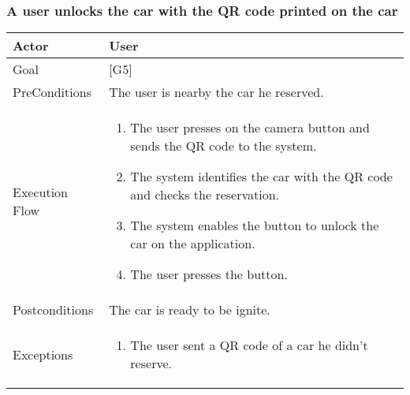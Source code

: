 \documentclass{article}
\begin{document}
	\subsubsection{A user unlocks the car with the QR code printed on the car}
	\begin{tabularx}{\textwidth}{  l  X  }
		\hline
		Actor & User\\
		\hline
		Goal & [G5]\\
		\hline
		PreConditions & The user is nearby the car he reserved.\\
		\hline
		Execution Flow & \begin{enumerate}
			\item{The user presses on the camera button and sends the QR code to the system.}
										 \item{The system identifies the car with the QR code and checks the reservation.}
										 \item{The system enables the button to unlock the car on the application.}
										 \item{The user presses the button.}
										\end{enumerate}\\
		\hline
		Postconditions & The car is ready to be ignite.\\
		\hline
		Exceptions & \begin{enumerate}
			\item{The user sent a QR code of a car he didn't reserve.}
	\end{enumerate}\\
		\hline
	\end{tabularx}
\end{document}
